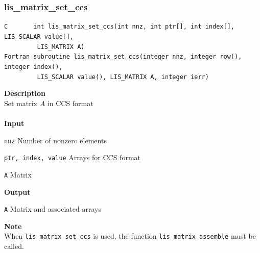 \documentclass[a4paper]{article}
\newcommand{\namelistlabel}[1]{\mbox{#1}\hfill}
\newenvironment{namelist}[1]{%
 \begin{list}{}
  {\let\makelabel\namelistlabel
  \settowidth{\labelwidth}{#1}
  \setlength{\leftmargin}{1.1\labelwidth}}
}{%
\end{list}}
\begin{document}
  \subsubsection{lis\_matrix\_set\_ccs}
\begin{screen}
\verb|C       int lis_matrix_set_ccs(int nnz, int ptr[], int index[], LIS_SCALAR value[],|\\
\verb|         LIS_MATRIX A)|\\
\verb|Fortran subroutine lis_matrix_set_ccs(integer nnz, integer row(), integer index(),|\\
\verb|         LIS_SCALAR value(), LIS_MATRIX A, integer ierr)|
\end{screen}
{\bf Description}\\
\indent
Set matrix $A$ in CCS format
\\ \\
\noindent
{\bf Input}
\begin{namelist}{XXXXXXXXXXXXXXXXXXXX}
\item[\tt nnz] Number of nonzero elements
\item[\tt ptr, index, value] Arrays for CCS format
\item[\tt A] Matrix
\end{namelist}
{\bf Output}
\begin{namelist}{XXXXXXXXXXXXXXXXXXXX}
\item[\tt A] Matrix and associated arrays 
\end{namelist}
\noindent
{\bf Note}\\
\indent
When \verb|lis_matrix_set_ccs| is used, 
the function \verb|lis_matrix_assemble| must be called. 
\newpage
\end{document}
